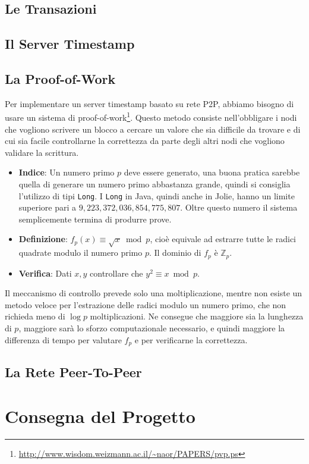 \documentclass{article}
\begin{document}
\subsection{Le Transazioni}
%
%
\subsection{Il Server Timestamp}
%
%
\subsection{La Proof-of-Work}
%
Per implementare un server timestamp basato su rete P2P, abbiamo bisogno di usare un sistema di proof-of-work\footnote{\url{http://www.wisdom.weizmann.ac.il/~naor/PAPERS/pvp.ps}}. Questo metodo consiste nell'obbligare i nodi che vogliono scrivere un blocco a cercare un valore che sia difficile da trovare e di cui sia facile controllarne la correttezza da parte degli altri nodi che vogliono validare la scrittura.
%
\begin{itemize}
    \item \textbf{Indice}: Un numero primo $p$ deve essere generato, una buona pratica sarebbe quella di generare un numero primo abbastanza grande, quindi si consiglia l'utilizzo di tipi \texttt{Long}. I \texttt{Long} in Java, quindi anche in Jolie, hanno un limite superiore pari a $9,223,372,036,854,775,807$. Oltre questo numero il sistema semplicemente termina di produrre prove.
    \item \textbf{Definizione}: $f_p(x) \equiv \sqrt{x} \bmod p$, cioè equivale ad estrarre tutte le radici quadrate modulo il numero primo $p$. Il dominio di $f_p$ è $\mathbb{Z}_p$.
    \item \textbf{Verifica}:  Dati $x,y$ controllare che $y^2 \equiv x \bmod p$.
\end{itemize}
%
Il meccanismo di controllo prevede solo una moltiplicazione, mentre non esiste un metodo veloce per l'estrazione delle radici modulo un numero primo, che non richieda meno di $\log{p}$ moltiplicazioni. Ne consegue che maggiore sia la lunghezza di $p$, maggiore sarà lo sforzo computazionale necessario, e quindi maggiore la differenza di tempo per valutare $f_p$ e per verificarne la correttezza.
%
\subsection{La Rete Peer-To-Peer}
%
%
\section{Consegna del Progetto}
%
\end{document}
